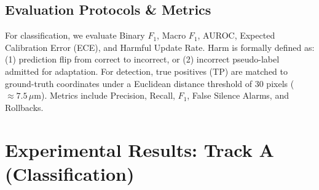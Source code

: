 \documentclass[conference]{IEEEtran}
\begin{document}
\subsection{Evaluation Protocols \& Metrics}
For classification, we evaluate Binary $F_1$, Macro $F_1$, AUROC, Expected Calibration Error (ECE), and Harmful Update Rate. Harm is formally defined as: (1) prediction flip from correct to incorrect, or (2) incorrect pseudo-label admitted for adaptation.
For detection, true positives (TP) are matched to ground-truth coordinates under a Euclidean distance threshold of 30 pixels ($\approx 7.5\,\mu\text{m}$). Metrics include Precision, Recall, $F_1$, False Silence Alarms, and Rollbacks.

\section{Experimental Results: Track A (Classification)}
\end{document}
